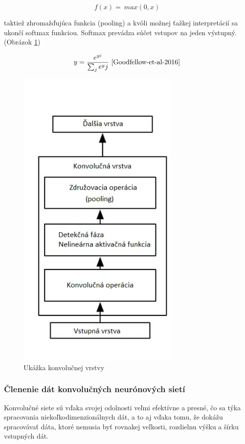 \[ f(x) =\ max (0,x)\]

taktiež zhromažďujúca funkcia (pooling) a kvôli možnej ťažkej interpretácií sa ukončí softmax funkciou. Softmax prevádza súčet vstupov na jeden výstupný.  
(Obrázok \ref{fig:CNN})

\[y = \frac{e^{yi}}{\sum_je^yj}\ \cite{Goodfellow-et-al-2016}\]


\begin{figure}[h!]
\begin{centering}
\includegraphics[width=8cm]{assets/images/233_1.JPG}
\par\end{centering}
\caption{Ukážka konvolučnej vrstvy \label{fig:CNN}\cite{Goodfellow-et-al-2016}}
\end{figure}


\subsubsection{Členenie dát konvolučných neurónových sietí}

\hspace{10mm}Konvolučné siete sú vďaka svojej odolnosti  veľmi efektívne a presné, čo sa týka spracovania niekoľkodimenzionálnych dát, a to aj vďaka tomu, že dokážu spracovávať dáta, ktoré nemusia byť rovnakej veľkosti, rozdielnu výšku a šírku vstupných dát.

